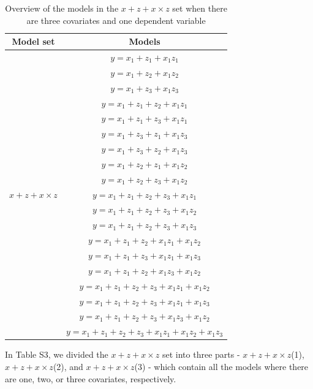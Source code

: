 \begin{table}[hbt!]
\caption{}
\caption*{Overview of the models in the $x + z + x \times z$ set when there are three covariates and one dependent variable}
\centering
\begin{tabular}{cc}
\toprule
Model set & Models \\ 
\midrule
\multirow{19}{*}{$x + z + x \times z$} & $y=x_1+z_1+x_1z_1$\\ &  $y=x_1+z_2+x_1z_2$\\ &  $y=x_1+z_3+x_1z_3$\\ & $y=x_1+z_1+z_2+x_1z_1$\\ & $y=x_1+z_1+z_3+x_1z_1$\\ & $y=x_1+z_3+z_1+x_1z_3$\\ & $y=x_1+z_3+z_2+x_1z_3$\\ & $y=x_1+z_2+z_1+x_1z_2$\\ & $y=x_1+z_2+z_3+x_1z_2$\\ & $y=x_1+z_1+z_2+z_3+x_1z_1$\\ & $y=x_1+z_1+z_2+z_3+x_1z_2$\\ & $y=x_1+z_1+z_2+z_3+x_1z_3$\\ & $y=x_1+z_1+z_2+x_1z_1+x_1z_2$\\ & $y=x_1+z_1+z_3+x_1z_1+x_1z_3$\\ & $y=x_1+z_1+z_2+x_1z_3+x_1z_2$\\ & $y=x_1+z_1+z_2+z_3+x_1z_1+x_1z_2$\\ & $y=x_1+z_1+z_2+z_3+x_1z_1+x_1z_3$\\ & $y=x_1+z_1+z_2+z_3+x_1z_3+x_1z_2$\\ & $y=x_1+z_1+z_2+z_3+x_1z_1+x_1z_2+x_1z_3$\\  
\bottomrule
\end{tabular}
\end{table}

In Table S3, we divided the $x + z + x \times z$ set into three parts - $x + z + x \times z$(1), $x + z + x \times z$(2), and $x + z + x \times z$(3) - which contain all the models where there are one, two, or three covariates, respectively. \\

